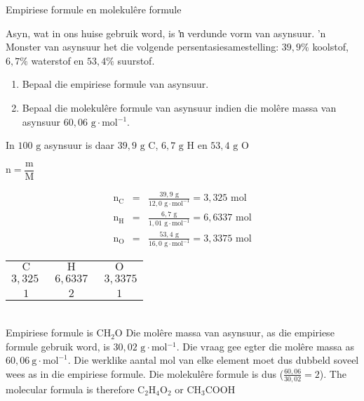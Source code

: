     \noindent
\label{m38712*secfhsst!!!underscore!!!id1308} 
      \noindent 
      \begin{wex}{Empiriese formule en molekul\^{e}re formule
      }
 {
Asyn, wat in ons huise gebruik word, is ŉ verdunde vorm van asynsuur. 'n Monster van
      asynsuur het die volgende persentasiesamestelling: $39,9\%$ koolstof, $6,7\%$ waterstof en $53,4\%$ suurstof.  
\begin{enumerate}[noitemsep, label=\textbf{\arabic*}. ] 
\item Bepaal die empiriese formule van asynsuur.
\item Bepaal die molekulêre formule van asynsuur indien die mol\^{e}re massa van asynsuur $60,06 \text{ g} \cdot \text{mol}{}^{-1}$.
\end{enumerate}
     }
{
      \label{m38712*id281607}In $100 \text{ g}$ asynsuur is daar $39,9 \text{ g C}$, $6,7 \text{ g H}$ en $53,4\text{ g O}$ 

        $\text{n}=\dfrac{\text{m}}{\text{M}}$
      
      \label{m38712*id281653}\nopagebreak\noindent{}
        
    \begin{eqnarray*}
{\text{n}}_{\text{C}} & = & \frac{39,9 \text{ g}}{12,0 \text{ g} \cdot \text{mol}^{-1}} = 3,325 \text{ mol} \\
{\text{n}}_{\text{H}} & = & \frac{6,7 \text{ g}}{1,01 \text{ g} \cdot \text{mol}^{-1}} = 6,6337 \text{ mol} \\
{\text{n}}_{\text{O}} & = & \frac{53,4 \text{ g}}{16,0 \text{ g} \cdot \text{mol}^{-1}} = 3,3375 \text{ mol}
      \end{eqnarray*}
\begin{tabular}{c@{:}c@{:}c}
$\text{C}$ & $\text{H}$ & $\text{O}$\\
$3,325~$ & $~6,6337~$ & $~3,3375$ \\
$1$ & $2$ & $1$\\
\end{tabular}\\
Empiriese formule is $\text{CH}{}_{2}\text{O}$ 
      \label{m38712*id281834}Die mol\^{e}re massa van asynsuur, as die empiriese formule gebruik word, is $30,02 \text{ g} \cdot \text{mol}{}^{-1}$. Die vraag gee egter die mol\^{e}re massa as $60,06~\text{g}\cdot \text{mol}^{-1}$. Die werklike aantal mol van elke element moet dus dubbeld soveel wees as in die empiriese formule. Die molekul\^{e}re formule is dus  ($\frac{60,06}{30,02}=2$).
      \label{m38712*id281854}The molecular formula is therefore $\text{C}{}_{2}\text{H}{}_{4}\text{O}{}_{2}$ or $\text{CH}{}_{3}\text{COOH}$
}
    \end{wex}
